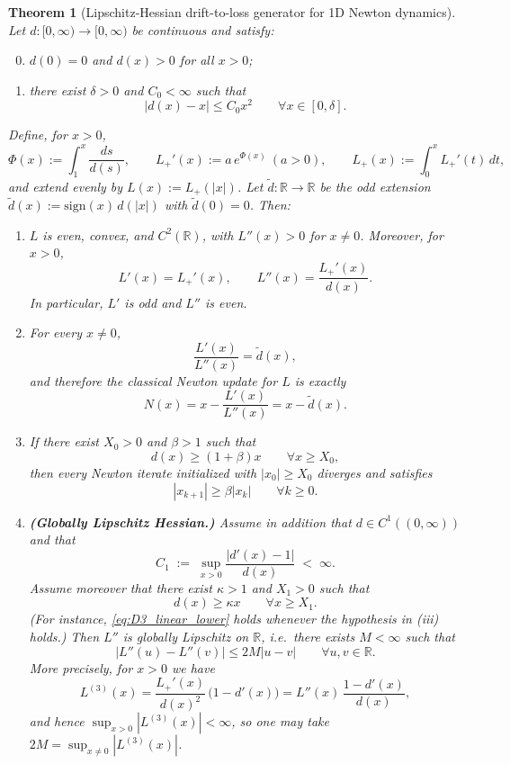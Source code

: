 \documentclass{article}
\theoremstyle{plain}
\newtheorem{theorem}{Theorem}[section]
\theoremstyle{definition}
\theoremstyle{remark}
\begin{document}
\begin{theorem}[Lipschitz-Hessian drift-to-loss generator for 1D Newton dynamics]
\label{thm:drift_to_loss_lipschitz}
Let $d:[0,\infty)\to[0,\infty)$ be continuous and satisfy:
{\renewcommand{\labelenumi}{(D\arabic{enumi})}%
\begin{enumerate}
\setcounter{enumi}{-1}
\item $d(0)=0$ and $d(x)>0$ for all $x>0$;
\item there exist $\delta>0$ and $C_0<\infty$ such that
\[
|d(x)-x|\le C_0x^2 \qquad \forall x\in[0,\delta].
\]
\end{enumerate}}

Define, for $x>0$,
\[
\Phi(x):=\int_1^x \frac{ds}{d(s)},\qquad
L_+'(x):=a\,e^{\Phi(x)}\ (a>0),\qquad
L_+(x):=\int_0^x L_+'(t)\,dt,
\]
and extend evenly by $L(x):=L_+(|x|)$. Let $\tilde d:\mathbb{R}\to\mathbb{R}$ be the odd extension
$\tilde d(x):=\mathrm{sign}(x)\,d(|x|)$ with $\tilde d(0)=0$. Then:
{\renewcommand{\labelenumi}{(\roman{enumi})}%
\begin{enumerate}
\item $L$ is even, convex, and $C^2(\mathbb{R})$, with $L''(x)>0$ for $x\neq 0$.
Moreover, for $x>0$,
\[
L'(x)=L_+'(x),\qquad
L''(x)=\frac{L_+'(x)}{d(x)}.
\]
In particular, $L'$ is odd and $L''$ is even.

\item For every $x\neq 0$,
\[
\frac{L'(x)}{L''(x)}=\tilde d(x),
\]
and therefore the classical Newton update for $L$ is exactly
\[
N(x)=x-\frac{L'(x)}{L''(x)}=x-\tilde d(x).
\]

\item If there exist $X_0>0$ and $\beta>1$ such that
\[
d(x)\ge (1+\beta)x \qquad \forall x\ge X_0,
\]
then every Newton iterate initialized with $|x_0|\ge X_0$ diverges and satisfies
\[
|x_{k+1}|\ge \beta|x_k| \qquad \forall k\ge 0.
\]

\item \textbf{(Globally Lipschitz Hessian.)}
Assume in addition that $d\in C^1((0,\infty))$ and that
\begin{equation}
\label{eq:D2_ratio}
C_1 \;:=\;\sup_{x>0}\frac{|d'(x)-1|}{d(x)}\;<\;\infty.
\end{equation}
Assume moreover that there exist $\kappa>1$ and $X_1>0$ such that
\begin{equation}
\label{eq:D3_linear_lower}
d(x)\ge \kappa x \qquad \forall x\ge X_1.
\end{equation}
(For instance, \cref{eq:D3_linear_lower} holds whenever the hypothesis in (iii) holds.)
Then $L''$ is globally Lipschitz on $\mathbb{R}$, i.e.\ there exists $M<\infty$ such that
\[
|L''(u)-L''(v)|\le 2M|u-v|\qquad \forall u,v\in\mathbb{R}.
\]
More precisely, for $x>0$ we have
\begin{equation}
\label{eq:L3_formula}
L^{(3)}(x)=\frac{L_+'(x)}{d(x)^2}\,\bigl(1-d'(x)\bigr)
= L''(x)\,\frac{1-d'(x)}{d(x)},
\end{equation}
and hence $\sup_{x>0}|L^{(3)}(x)|<\infty$, so one may take
$2M=\sup_{x\neq 0}|L^{(3)}(x)|$.
\end{enumerate}}
\end{theorem}
\end{document}
